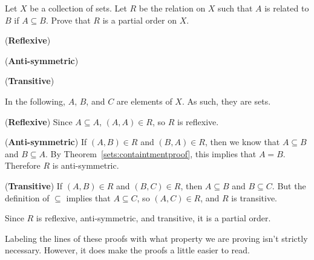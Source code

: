 \begin{exer}
Let $X$ be a collection of sets. Let $R$ be the relation on $X$
such that $A$ is related to $B$ if $A \subseteq B$.
Prove that $R$ is a partial order on $X$.
\begin{pf}
({\bf Reflexive}) \blanklinefill

\noindent
({\bf Anti-symmetric}) \blanklinefill

\noindent
\blanklinefill

\noindent
({\bf Transitive}) \blanklinefill

\noindent
\blanklinefill

\noindent
\blanklinefill
\end{pf}
\begin{answer}
In the following, $A$, $B$, and $C$ are elements of $X$.  As such, they are sets.

\noindent
({\bf Reflexive}) 
Since $A\subseteq A$, $(A,A)\in R$, so $R$ is reflexive.

\noindent
({\bf Anti-symmetric}) 
If $(A,B)\in R$ and $(B,A)\in R$, then we know that 
$A\subseteq B$ and $B\subseteq A$.  By Theorem~\ref{sets:containtmentproof}, this implies
that $A=B$.  Therefore $R$ is anti-symmetric.

\noindent
({\bf Transitive}) 
If $(A,B)\in R$ and $(B,C)\in R$, then $A\subseteq B$ and $B\subseteq C$.  But the definition
of $\subseteq$ implies that $A\subseteq C$, so $(A,C)\in R$, and $R$ is transitive.

\noindent
Since $R$ is reflexive, anti-symmetric, and transitive, it is a partial order.
\end{answer}
\end{exer}

Labeling the lines of these proofs with what property we are proving isn't strictly necessary.
However, it does make the proofs a little easier to read.


